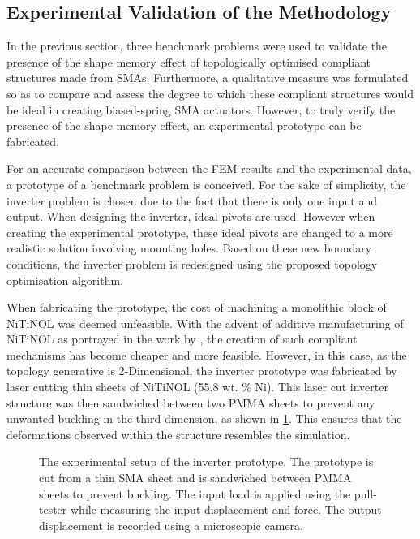 \subsection{Experimental Validation of the Methodology}
In the previous section, three benchmark problems were used to validate the presence of the shape memory effect of topologically optimised compliant structures made from SMAs. Furthermore, a qualitative measure was formulated so as to compare and assess the degree to which these compliant structures would be ideal in creating biased-spring SMA actuators. However, to truly verify the presence of the shape memory effect, an experimental prototype can be fabricated.

For an accurate comparison between the FEM results and the experimental data, a prototype of a benchmark problem is conceived. For the sake of simplicity, the inverter problem is chosen due to the fact that there is only one input and output. When designing the inverter, ideal pivots are used. However when creating the experimental prototype, these ideal pivots are changed to a more realistic solution involving mounting holes. Based on these new boundary conditions, the inverter problem is redesigned using the proposed topology optimisation algorithm.

When fabricating the prototype, the cost of machining a monolithic block of NiTiNOL was deemed unfeasible. With the advent of additive manufacturing of NiTiNOL as portrayed in the work by \todocite, the creation of such compliant mechanisms has become cheaper and more feasible. However, in this case, as the topology generative is 2-Dimensional, the inverter prototype was fabricated by laser cutting thin sheets of NiTiNOL (55.8 wt. \% Ni). This laser cut inverter structure was then sandwiched between two PMMA sheets to prevent any unwanted buckling in the third dimension, as shown in \cref{fig:inverter-proto-setup}. This ensures that the deformations observed within the structure resembles the simulation.

\begin{figure}[t!]
    \centering
    \resizebox{\textwidth}{!}{}
    \caption{The experimental setup of the inverter prototype. The prototype is cut from a thin SMA sheet and is sandwiched between PMMA sheets to prevent buckling. The input load is applied using the pull-tester while measuring the input displacement and force. The output displacement is recorded using a microscopic camera.}
    \label{fig:inverter-proto-setup}
\end{figure}

